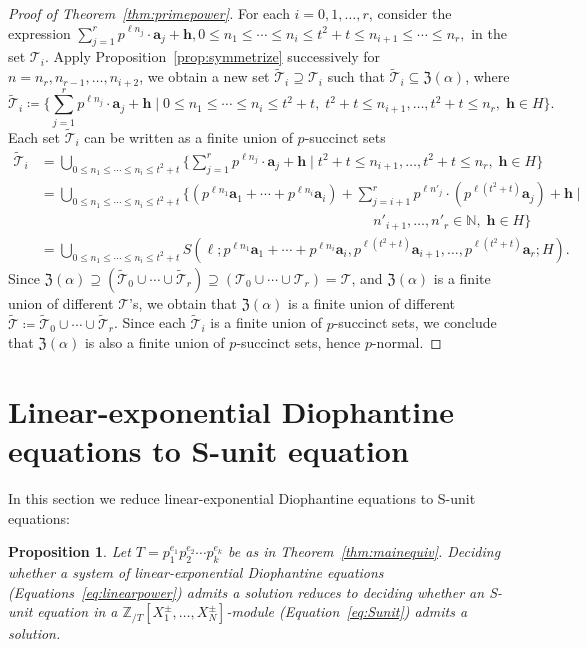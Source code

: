 \documentclass[letterpaper, 11pt, thm-restate]{article}
\numberwithin{equation}{section}
\newcommand{\N}{\mathbb{N}}
\newcommand{\ZT}{\mathbb{Z}_{/T}}
\newcommand{\mT}{\mathcal{T}}
\newcommand{\mZ}{\mathfrak{Z}}
\newcommand{\ba}{\boldsymbol{a}}
\newcommand{\bh}{\boldsymbol{h}}
\newtheorem{prop}[thrm]{Proposition}
\theoremstyle{definition}
\theoremstyle{definition}
\theoremstyle{definition}
\begin{document}
\begin{proof}[Proof of Theorem~\ref{thm:primepower}]
    For each $i = 0, 1, \ldots, r$, consider the expression $\sum_{j = 1}^{r} p^{\ell n_j} \cdot \ba_j + \bh, 0 \leq n_1 \leq \cdots \leq n_i \leq t^2 + t \leq n_{i+1} \leq \cdots \leq n_r,$ in the set $\mT_i$.
    Apply Proposition~\ref{prop:symmetrize} successively for $n = n_r, n_{r-1}, \ldots, n_{i+2}$, we obtain a new set $\widetilde{\mT}_i \supseteq \mT_i$ such that $\widetilde{\mT}_i \subseteq \mZ(\alpha)$, where
    \[
    \widetilde{\mT}_i \coloneqq \Bigg\{\sum_{j = 1}^{r} p^{\ell n_j} \cdot \ba_j + \bh \;\Bigg|\; 0 \leq n_1 \leq \cdots \leq n_i \leq t^2 + t, \; t^2+t \leq n_{i+1}, \ldots, t^2+t \leq n_r,\; \bh \in H \Bigg\}.
    \]
    Each set $\widetilde{\mT}_i$ can be written as a finite union of $p$-succinct sets
    \begin{align*}
    \widetilde{\mT}_i
    & = \bigcup_{0 \leq n_1 \leq \cdots \leq n_i \leq t^2 + t} \Bigg\{\sum_{j = 1}^{r} p^{\ell n_j} \cdot \ba_j + \bh \;\Bigg|\; t^2+t \leq n_{i+1}, \ldots, t^2+t \leq n_r,\; \bh \in H \Bigg\} \\
    & = \bigcup_{0 \leq n_1 \leq \cdots \leq n_i \leq t^2 + t} \Bigg\{\left(p^{\ell n_1} \ba_1 + \cdots + p^{\ell n_i} \ba_i\right) + \sum_{j = i+1}^{r} p^{\ell n'_j} \cdot \left( p^{\ell(t^2 + t)} \ba_j \right) + \bh \;\Bigg|\; \\
    & \hspace{10cm} n'_{i+1}, \ldots, n'_r \in \N,\; \bh \in H \Bigg\} \\
    & = \bigcup_{0 \leq n_1 \leq \cdots \leq n_i \leq t^2 + t} S\left(\ell; p^{\ell n_1} \ba_1 + \cdots + p^{\ell n_i} \ba_i, p^{\ell(t^2 + t)} \ba_{i+1}, \ldots, p^{\ell(t^2 + t)} \ba_r; H\right).
    \end{align*}
    Since $\mZ(\alpha) \supseteq \left(\widetilde{\mT}_0 \cup \cdots \cup \widetilde{\mT}_r \right) \supseteq \left(\mT_0 \cup \cdots \cup \mT_r \right) = \mT$, and $\mZ(\alpha)$ is a finite union of different $\mT$'s, we obtain that $\mZ(\alpha)$ is a finite union of different $\widetilde{\mT} \coloneqq \widetilde{\mT}_0 \cup \cdots \cup \widetilde{\mT}_r$.
    Since each $\widetilde{\mT}_i$ is a finite union of $p$-succinct sets, we conclude that $\mZ(\alpha)$ is also a finite union of $p$-succinct sets, hence $p$-normal.
\end{proof}

\section{Linear-exponential Diophantine equations to S-unit equation}\label{sec:ltos}
In this section we reduce linear-exponential Diophantine equations to S-unit equations:
\begin{prop}\label{prop:lintoSunit}
    Let $T = p_1^{e_1} p_2^{e_2} \cdots p_k^{e_k}$ be as in Theorem~\ref{thm:mainequiv}.
    Deciding whether a system of linear-exponential Diophantine equations (Equations~\eqref{eq:linearpower}) admits a solution reduces to deciding whether an S-unit equation in a $\ZT[X_1^{\pm}, \ldots, X_N^{\pm}]$-module (Equation~\eqref{eq:Sunit}) admits a solution.
\end{prop}
\end{document}
